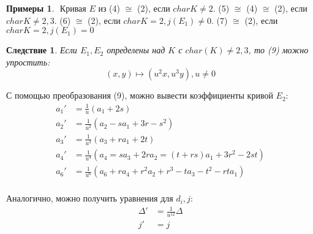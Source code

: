\documentclass[12pt]{article}
\newtheorem{corollary}[theorem]{Следствие}
\theoremstyle{definition}
\theoremstyle{definition}
\newtheorem{examples}[theorem]{Примеры}
\theoremstyle{definition}
\begin{document}
            \begin{examples} $ $\newline
                Кривая $E$ из (4) $\cong$ (2), если $char K \neq 2$.\newline
                (5) $\cong$ (4) $\cong$ (2), если $char K \neq 2,3$.\newline
                (6) $\cong$ (2), если $char K = 2, j(E_1)\neq0$.\newline
                (7) $\cong$ (2), если $char K = 2, j(E_1)=0$
            \end{examples}
            
            \begin{corollary}
                Если $E_1, E_2$ определены над $K$ с $char(K) \neq 2,3$, то (9) можно упростить:
                \[
                    (x,y) \mapsto (u^2x, u^3y), u \neq 0
                \]
            \end{corollary}
            
            С помощью преобразования (9), можно вывести коэффициенты кривой $E_2$:
            \begin{align}
                a_1' &= \frac{1}{u}(a_1+2s) \\  \nonumber
                a_2' &= \frac{1}{u^2}(a_2-sa_1+3r-s^2) \\ \nonumber
                a_3' &= \frac{1}{u^3}(a_3+ra_1+2t) \\ \nonumber
                a_4' &= \frac{1}{u^4}(a_4 = sa_3 + 2ra_2 = (t+rs)a_1 + 3r^2 - 2st) \\ \nonumber
                a_6' &= \frac{1}{u^6}(a_6 + ra_4 + r^2a_2 + r^3 - ta_3 - t^2 - rta_1) \\ \nonumber
            \end{align}
            
            Аналогично, можно получить уравнения для $d_i, j$:
            \begin{align*}
                \Delta' &= \frac{1}{u^{12}}\Delta \\
                j' &= j
            \end{align*}
            
\end{document}
